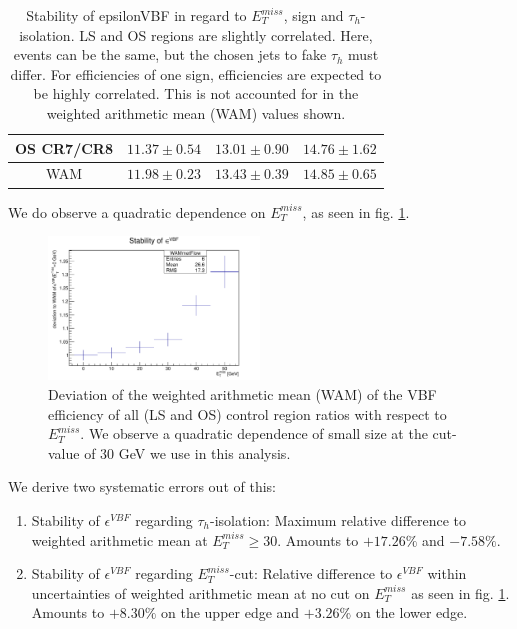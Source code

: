\begin{table}[!h]
\begin{tabular}{|c||c|c|c|}
		OS CR7/CR8 & $11.37\pm0.54$ & $13.01\pm0.90$ & $14.76\pm1.62$ \\ \hline \hline
		WAM        & $11.98\pm0.23$ & $13.43\pm0.39$ & $14.85\pm0.65$ \\ \hline
	\end{tabular}
	\caption{Stability of epsilonVBF in regard to $E_{T}^{miss}$, sign and $\tau_{h}$-isolation. LS and OS regions are slightly correlated. Here, events can be the same, but the chosen jets to fake $\tau_{h}$ must differ. For efficiencies of one sign, efficiencies are expected to be highly correlated. This is not accounted for in the weighted arithmetic mean (WAM) values shown.}
	\label{dihad:tab:stability}
\end{table}
We do observe a quadratic dependence on $E_{T}^{miss}$, as seen in fig. \ref{dihad:fig:Stability}.

\begin{figure}[!h]
	\centering
	\includegraphics[width=0.5\textwidth]{PLOTS/diTauHadLSQCDPlots/stability/Stability.pdf}
	\caption{\label{dihad:fig:Stability}Deviation of the weighted arithmetic mean (WAM) of the VBF efficiency of all (LS and OS) control region ratios with respect to $E_{T}^{miss}$. We observe a quadratic dependence of small size at the cut-value of 30 GeV we use in this analysis.}
\end{figure}

We derive two systematic errors out of this:
\begin{enumerate}
	\item Stability of $\epsilon^{VBF}$ regarding $\tau_{h}$-isolation: Maximum relative difference to weighted arithmetic mean at $E_{T}^{miss}\geq30$. Amounts to $+17.26\%$ and $-7.58\%$.
	\item Stability of $\epsilon^{VBF}$ regarding $E_{T}^{miss}$-cut: Relative difference to $\epsilon^{VBF}$ within uncertainties of weighted arithmetic
	mean at no cut on $E_{T}^{miss}$ as seen in fig. \ref{dihad:fig:Stability}. Amounts to $+8.30\%$ on the upper edge and $+3.26\%$ on the lower edge.
\end{enumerate}

\clearpage



